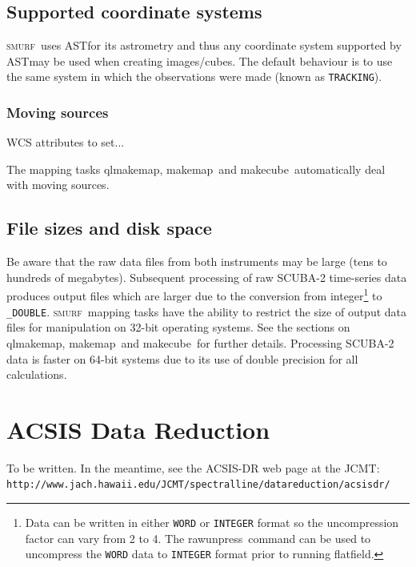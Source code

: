 \documentclass[twoside,11pt]{article}
\newcommand{\htmladdnormallink}[2]{#1}
\newcommand{\xref}[3]{#1}
\newcommand{\xlabel}[1]{}
\renewcommand{\_}{\texttt{\symbol{95}}}
\newcommand{\SMURF}{\textsc{smurf}}
\newcommand{\AST}{\xref{AST}{sun210}}
\newcommand{\task}[1]{\textsf{#1}}
\newcommand{\makecube}{\xref{\task{makecube}}{sun258}{MAKECUBE}}
\newcommand{\qlmakemap}{\xref{\task{qlmakemap}}{sun258}{QLMAKEMAP}}
\newcommand{\rawunpress}{\xref{\task{rawunpress}}{sun258}{RAWUNPRESS}}
\newcommand{\flatfield}{\xref{\task{flatfield}}{sun258}{FLATFIELD}}
\newcommand{\makemap}{\xref{\task{makemap}}{sun258}{MAKEMAP}}
\begin{document}
\subsection{Supported coordinate systems}

\SMURF\ uses \AST\ for its astrometry and thus any coordinate system
supported by \AST\ may be used when creating images/cubes. The default
behaviour is to use the same system in which the observations were
made (known as \texttt{TRACKING}).

\subsubsection{Moving sources}

WCS attributes to set...

The mapping tasks \qlmakemap, \makemap\ and \makecube\ automatically
deal with moving sources.

\subsection{File sizes and disk space}

Be aware that the raw data files from both instruments may be large
(tens to hundreds of megabytes). Subsequent processing of raw SCUBA-2
time-series data produces output files which are larger
due to the conversion from integer\footnote{Data can be written in either \texttt{\_WORD} or \texttt{\_INTEGER} format so the uncompression factor can vary from 2 to 4. The \rawunpress\ command can be used to uncompress the \texttt{\_WORD} data to \texttt{\_INTEGER} format prior to running \flatfield.}
to \verb+_DOUBLE+. \SMURF\
mapping tasks have the ability to restrict the size of output data
files for manipulation on 32-bit operating systems. See the sections
on \qlmakemap, \makemap\ and \makecube\ for further
details. Processing SCUBA-2 data is faster on 64-bit systems due to
its use of double precision for all calculations.

\section{\xlabel{acsis}ACSIS Data Reduction\label{se:acsisdr}}

To be written. In the meantime, see the ACSIS-DR web page at the JCMT:\\
\htmladdnormallink{\texttt{http://www.jach.hawaii.edu/JCMT/spectral\_line/data\_reduction/acsisdr/}}
{http://www.jach.hawaii.edu/JCMT/spectral_line/data_reduction/acsisdr/}
\end{document}
